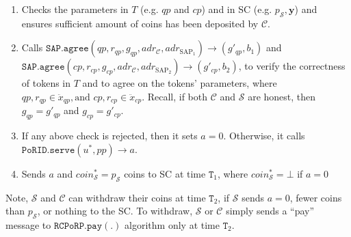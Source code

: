\begin{enumerate}
\begin{enumerate}

\item Checks the parameters  in $T$ (e.g. $qp$ and $cp$) and  in SC (e.g. $p_{\scriptscriptstyle\mathcal{S}}, \bm{y}$) and ensures sufficient amount of coins has been deposited by $\mathcal C$.  

\item Calls $\mathtt{SAP.agree}(qp,r_{\scriptscriptstyle qp},g_{\scriptscriptstyle qp},adr_{\scriptscriptstyle\mathcal{C}},adr_{\scriptscriptstyle\text{SAP}_{1}})\rightarrow (g'_{\scriptscriptstyle qp},b_{\scriptscriptstyle 1})$ and $\mathtt{SAP.agree}(cp,r_{\scriptscriptstyle cp},g_{\scriptscriptstyle cp},adr_{\scriptscriptstyle\mathcal{C}},adr_{\scriptscriptstyle\text{SAP}_{2}})\rightarrow (g'_{\scriptscriptstyle cp},b_{\scriptscriptstyle 2})$, to verify the correctness of tokens in $T$ and to agree on the tokens' parameters, where $qp,r_{\scriptscriptstyle qp}\in \ddot{x}_{\scriptscriptstyle qp}, \text{and }  cp,r_{\scriptscriptstyle cp} \in  \ddot{x}_{\scriptscriptstyle cp}$. Recall, if both $\mathcal{C}$ and $\mathcal{S}$ are honest, then $g_{\scriptscriptstyle qp}=g'_{\scriptscriptstyle qp}$ and $g_{\scriptscriptstyle cp}=g'_{\scriptscriptstyle cp}$. 




\item If any above check is rejected, then it sets $a=0$. Otherwise, it  calls $\mathtt{PoRID.serve}(u^{\scriptscriptstyle *}, {pp})\rightarrow a$. 

\item Sends $a$ and $coin^{\scriptscriptstyle *}_{\scriptscriptstyle\mathcal S}=p_{\scriptscriptstyle\mathcal{S}}$ coins to SC at time $\texttt{T}_{\scriptscriptstyle 1}$, where  $coin^{\scriptscriptstyle *}_{\scriptscriptstyle\mathcal S}=\bot$ if $a=0$
\end{enumerate}
Note, $\mathcal S$  and  $\mathcal C$ can withdraw their coins at time $\texttt{T}_{\scriptscriptstyle 2}$, if  $\mathcal S$ sends $a=0$, fewer coins than $p_{\scriptscriptstyle\mathcal{S}}$, or nothing to the SC. To withdraw, $\mathcal S$  or  $\mathcal C$  simply sends a ``pay'' message to $\mathtt{RCPoRP}.\mathtt{pay}(.)$ algorithm only at time $\texttt{T}_{\scriptscriptstyle 2}$.

\







\end{enumerate}
